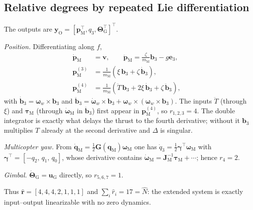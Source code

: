 \documentclass[letterpaper, 10 pt, conference]{ieeeconf}  %
\begin{document}
\subsection{Relative degrees by repeated Lie differentiation}
The outputs are $\mathbf{y}_\text{O}=[\mathbf{p}_\text{M}^\top,q_3,\boldsymbol{\Theta}_\text{G}^\top]^\top$.

\emph{Position.} Differentiating along $f$,
\begin{align}
\dot{\mathbf{p}}_\text{M}&=\mathbf{v},\qquad
\ddot{\mathbf{p}}_\text{M}=\tfrac{\zeta}{m_\text{M}}\mathbf{b}_3-g\mathbf{e}_3,\nonumber\\
\mathbf{p}_\text{M}^{(3)}&=\tfrac{1}{m_\text{M}}\!\left(\xi\,\mathbf{b}_3+\zeta\,\dot{\mathbf{b}}_3\right),\nonumber\\
\mathbf{p}_\text{M}^{(4)}&=\tfrac{1}{m_\text{M}}\!\left(\ddot{T}\,\mathbf{b}_3+2\xi\,\dot{\mathbf{b}}_3+\zeta\,\ddot{\mathbf{b}}_3\right),
\label{eq:psnap}
\end{align}
with $\dot{\mathbf{b}}_3=\boldsymbol{\omega}_w\times\mathbf{b}_3$ and $\ddot{\mathbf{b}}_3=\dot{\boldsymbol{\omega}}_w\times\mathbf{b}_3+\boldsymbol{\omega}_w\times(\boldsymbol{\omega}_w\times\mathbf{b}_3)$. The inputs $\ddot{T}$ (through $\xi$) and $\boldsymbol{\tau}_\text{M}$ (through $\dot{\boldsymbol{\omega}}_\text{M}$ in $\ddot{\mathbf{b}}_3$) first appear in $\mathbf{p}_\text{M}^{(4)}$, so $r_{1,2,3}=4$. The double integrator is exactly what delays the thrust to the fourth derivative; without it $\mathbf{b}_3$ multiplies $T$ already at the second derivative and $\Delta$ is singular.

\emph{Multicopter yaw.} From $\dot{\mathbf{q}}_\text{M}=\tfrac12\mathbf{G}(\mathbf{q}_\text{M})\boldsymbol{\omega}_\text{M}$ one has $\dot{q}_3=\tfrac12\boldsymbol{\gamma}^\top\boldsymbol{\omega}_\text{M}$ with $\boldsymbol{\gamma}^\top=[-q_2,\,q_1,\,q_0]$, whose derivative contains $\dot{\boldsymbol{\omega}}_\text{M}=\mathbf{J}_\text{M}^{-1}\boldsymbol{\tau}_\text{M}+\cdots$; hence $r_4=2$.

\emph{Gimbal.} $\dot{\boldsymbol{\Theta}}_\text{G}=\mathbf{u}_\text{G}$ directly, so $r_{5,6,7}=1$.

Thus $\hat{\mathbf{r}}=[4,4,4,2,1,1,1]$ and $\sum_i\hat{r}_i=17=\hat{N}$: the extended system is exactly input--output linearizable with no zero dynamics.
\end{document}
